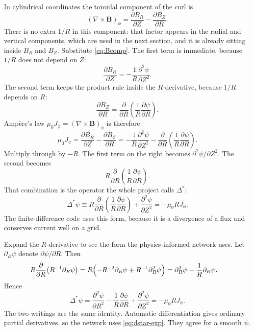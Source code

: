 \documentclass[11pt,a4paper,oneside,openany]{book}
\numberwithin{equation}{chapter}
\newcommand{\Dstar}{\Delta^{*}}
\newcommand{\grad}{\nabla}
\theoremstyle{definition}
\begin{document}
In cylindrical coordinates the toroidal component of the curl is
\begin{equation}
\label{eq:curlphi}
(\grad\times\mathbf{B})_{\phi}
=\frac{\partial B_{R}}{\partial Z}-\frac{\partial B_{Z}}{\partial R}.
\end{equation}
There is no extra \(1/R\) in this component: that factor appears in the radial and vertical components, which are used in the next section, and it is already sitting inside \(B_{R}\) and \(B_{Z}\). Substitute \eqref{eq:Bcomp}. The first term is immediate, because \(1/R\) does not depend on \(Z\):
\begin{equation}
\label{eq:dBr}
\frac{\partial B_{R}}{\partial Z}
=-\frac{1}{R}\frac{\partial^{2}\psi}{\partial Z^{2}}.
\end{equation}
The second term keeps the product rule inside the \(R\)-derivative, because \(1/R\) depends on \(R\):
\begin{equation}
\label{eq:dBz}
\frac{\partial B_{Z}}{\partial R}
=\frac{\partial}{\partial R}\!\left(\frac{1}{R}\frac{\partial\psi}{\partial R}\right).
\end{equation}
Amp\`ere's law \(\mu_{0} J_{\phi}=(\grad\times\mathbf{B})_{\phi}\) is therefore
\begin{equation}
\label{eq:Jphi-amp}
\mu_{0} J_{\phi}
=\frac{\partial B_{R}}{\partial Z}-\frac{\partial B_{Z}}{\partial R}
=-\frac{1}{R}\frac{\partial^{2}\psi}{\partial Z^{2}}
-\frac{\partial}{\partial R}\!\left(\frac{1}{R}\frac{\partial\psi}{\partial R}\right).
\end{equation}
Multiply through by \(-R\). The first term on the right becomes \(\partial^{2}\psi/\partial Z^{2}\). The second becomes
\[
R\frac{\partial}{\partial R}\!\left(\frac{1}{R}\frac{\partial\psi}{\partial R}\right).
\]
That combination is the operator the whole project calls \(\Dstar\):
\begin{equation}
\label{eq:dstar}
\Dstar\psi
\equiv
R\frac{\partial}{\partial R}\!\left(\frac{1}{R}\frac{\partial\psi}{\partial R}\right)
+\frac{\partial^{2}\psi}{\partial Z^{2}}
=-\mu_{0} R J_{\phi}.
\end{equation}
The finite-difference code uses this form, because it is a divergence of a flux and conserves current well on a grid.

Expand the \(R\)-derivative to see the form the physics-informed network uses. Let \(\partial_{R}\psi\) denote \(\partial\psi/\partial R\). Then
\begin{align}
R\frac{\partial}{\partial R}\!\left(R^{-1}\partial_{R}\psi\right)
&=R\Bigl(-R^{-2}\partial_{R}\psi+R^{-1}\partial_{R}^{2}\psi\Bigr)
=\partial_{R}^{2}\psi-\frac{1}{R}\partial_{R}\psi.
\label{eq:expand}
\end{align}
Hence
\begin{equation}
\label{eq:dstar-exp}
\Dstar\psi
=\frac{\partial^{2}\psi}{\partial R^{2}}
-\frac{1}{R}\frac{\partial\psi}{\partial R}
+\frac{\partial^{2}\psi}{\partial Z^{2}}
=-\mu_{0} R J_{\phi}.
\end{equation}
The two writings are the same identity. Automatic differentiation gives ordinary partial derivatives, so the network uses \eqref{eq:dstar-exp}. They agree for a smooth \(\psi\).
\end{document}
